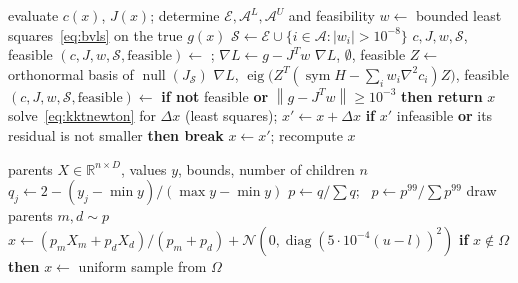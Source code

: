 \documentclass[11pt]{article}
\newcommand{\R}{\mathbb{R}}
\newcommand{\norm}[1]{\left\lVert #1 \right\rVert}
\newcommand{\code}[1]{\texttt{#1}}
\DeclareMathOperator{\sym}{sym}
\DeclareMathOperator{\diag}{diag}
\begin{document}
\begin{algorithm}[H]
\caption{KKT test and Newton polish (\code{kkt\_conditions}, \code{newton\_polish})}\label{alg:kkt}
\begin{algorithmic}[1]
  \State evaluate $c(x)$, $J(x)$; determine $\mathcal{E}, \mathcal{A}^L, \mathcal{A}^U$ and feasibility
  \State $w \gets$ bounded least squares~\eqref{eq:bvls} on the true $g(x)$
  \State $\mathcal{S} \gets \mathcal{E} \cup \{i \in \mathcal{A} : |w_i| > 10^{-8}\}$
  \State \Return $c, J, w, \mathcal{S}$, feasible
\EndFunction
{}
  \State $(c, J, w, \mathcal{S}, \text{feasible}) \gets$ ; $\nabla L \gets g - J^T w$
   \State \Return $\nabla L$, $\emptyset$, feasible
  \EndIf
  \State $Z \gets$ orthonormal basis of $\operatorname{null}(J_{\mathcal{S}})$
  \State \Return $\nabla L$, $\operatorname{eig}\big(Z^T(\sym H - \sum_i w_i \nabla^2 c_i) Z\big)$, feasible
\EndFunction
{}
  \State $(c, J, w, \mathcal{S}, \text{feasible}) \gets$ 
  \State \textbf{if not} feasible \textbf{or} $\norm{g - J^Tw} \ge 10^{-3}$ \textbf{then return} $x$
    \State solve~\eqref{eq:kktnewton} for $\Delta x$ (least squares); $x' \gets x + \Delta x$
    \State \textbf{if} $x'$ infeasible \textbf{or} its residual is not smaller \textbf{then break}
    \State $x \gets x'$; recompute 
  \EndFor
  \State \Return $x$
\EndFunction
\end{algorithmic}
\end{algorithm}

\begin{algorithm}[H]
\caption{Genetic step (\code{genetic\_step})}\label{alg:genetic}
\begin{algorithmic}[1]
\Require parents $X \in \R^{n\times D}$, values $y$, bounds, number of children $n$
\State $q_j \gets 2 - (y_j - \min y)/(\max y - \min y)$ 
\State $p \gets q/\sum q$; \ $p \gets p^{99} / \sum p^{99}$ 
  \State draw parents $m, d \sim p$
  \State $x \gets (p_m X_m + p_d X_d)/(p_m + p_d) + \mathcal{N}(0, \diag(5\cdot10^{-4}(u-l))^2)$
  \State \textbf{if} $x \notin \Omega$ \textbf{then} $x \gets$ uniform sample from $\Omega$
\EndFor
\end{algorithmic}
\end{algorithm}

\end{document}
